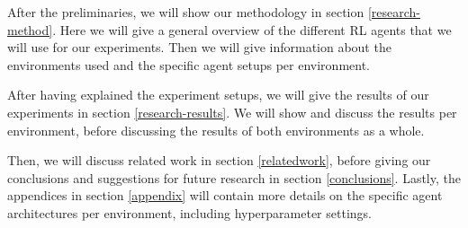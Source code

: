 After the preliminaries, we will show our methodology in section \ref{research-method}. Here we will give a general overview of the different RL agents that we will use for our experiments. Then we will give information about the environments used and the specific agent setups per environment. 

After having explained the experiment setups, we will give the results of our experiments in section \ref{research-results}. We will show and discuss the results per environment, before discussing the results of both environments as a whole.

Then, we will discuss related work in section \ref{relatedwork}, before giving our conclusions and suggestions for future research in section \ref{conclusions}. Lastly, the appendices in section \ref{appendix} will contain more details on the specific agent architectures per environment, including hyperparameter settings.